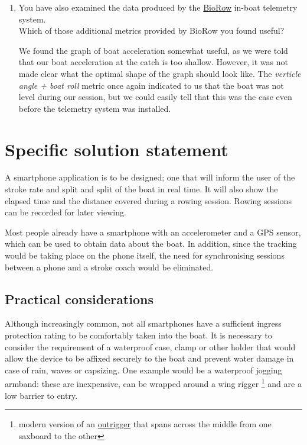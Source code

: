 \documentclass[11pt,twoside,a4paper]{report}
\begin{document}
\begin{enumerate}
  \item You have also examined the data produced by the \href{http://biorow.com/}{BioRow} in-boat telemetry system. \\ Which of those additional metrics provided by BioRow you found useful?
  
  We found the graph of boat acceleration somewhat useful, as we were told that our boat acceleration at the catch is too shallow. However, it was not made clear what the optimal shape of the graph should look like. The \textit{verticle angle + boat roll} metric once again indicated to us that the boat was not level during our session, but we could easily tell that this was the case even before the telemetry system was installed.

\end{enumerate}

\section{Specific solution statement}

A smartphone application is to be designed; one that will inform the user of the stroke rate and split and split of the boat in real time. It will also show the elapsed time and the distance covered during a rowing session. Rowing sessions can be recorded for later viewing. 

Most people already have a smartphone with an accelerometer and a GPS sensor, which can be used to obtain data about the boat. In addition, since the tracking would be taking place on the phone itself, the need for synchronising sessions between a phone and a stroke coach would be eliminated.

\subsection{Practical considerations}

Although increasingly common, not all smartphones have a sufficient ingress protection rating to be comfortably taken into the boat. 
It is necessary to consider the requirement of a waterproof case, clamp or other holder that would allow the device to be affixed securely to the boat and prevent water damage in case of rain, waves or capsizing. 
One example would be a waterproof jogging armband: these are inexpensive, can be wrapped around a wing rigger \footnote{modern version of an \href{https://en.wikipedia.org/wiki/Outrigger}{outrigger} that spans across the middle from one saxboard to the other} and are a low barrier to entry.
\end{document}

